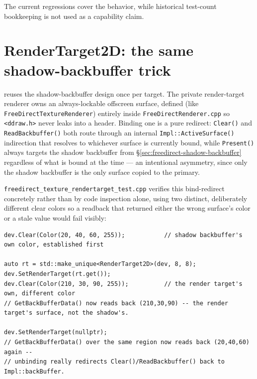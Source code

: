 The current regressions cover the behavior, while historical test-count bookkeeping is not used
as a capability claim.

\section{RenderTarget2D: the same shadow-backbuffer trick}

 reuses the shadow-backbuffer design once per target. The private
render-target renderer owns an always-lockable
offscreen surface, defined (like \texttt{FreeDirectTextureRenderer}) entirely
inside \texttt{FreeDirectRenderer.cpp} so \texttt{<ddraw.h>} never leaks into a header. Binding
one is a pure redirect: \texttt{Clear()} and \texttt{ReadBackbuffer()} both route through an
internal \texttt{Impl::ActiveSurface()} indirection that resolves to whichever surface is
currently bound, while \texttt{Present()} always targets the shadow backbuffer from
\S\ref{sec:freedirect-shadow-backbuffer} regardless of what is bound at the time --- an intentional
asymmetry, since only the
shadow backbuffer is the only surface copied to the primary.

\texttt{freedirect\_texture\_rendertarget\_test.cpp} verifies this bind-redirect concretely rather than
by code inspection alone, using two distinct, deliberately different clear colors so a
readback that returned either the wrong surface's color or a stale value would fail visibly:

\begin{lstlisting}
dev.Clear(Color(20, 40, 60, 255));           // shadow backbuffer's own color, established first

auto rt = std::make_unique<RenderTarget2D>(dev, 8, 8);
dev.SetRenderTarget(rt.get());
dev.Clear(Color(210, 30, 90, 255));          // the render target's own, different color
// GetBackBufferData() now reads back (210,30,90) -- the render target's surface, not the shadow's.

dev.SetRenderTarget(nullptr);
// GetBackBufferData() over the same region now reads back (20,40,60) again --
// unbinding really redirects Clear()/ReadBackbuffer() back to Impl::backBuffer.
\end{lstlisting}

